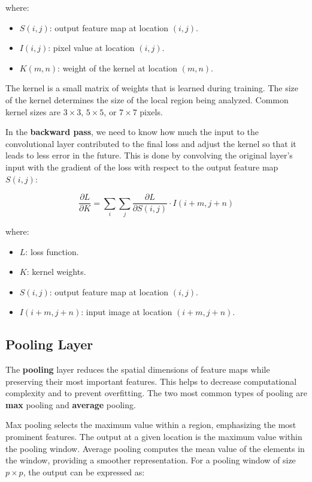 \documentclass[a4paper]{report}
\begin{document}
where:
\begin{itemize}
    \item $S(i,j)$: output feature map at location $(i,j)$.
    \item $I(i,j)$: pixel value at location $(i,j)$.
    \item $K(m,n)$: weight of the kernel at location $(m,n)$.
\end{itemize}

The kernel is a small matrix of weights that is learned during training. The size of the kernel determines the size of the local region being analyzed. Common kernel sizes are $3 \times 3$, $5 \times 5$, or $7 \times 7$ pixels.

In the \textbf{backward pass}, we need to know how much the input to the convolutional layer contributed to the final loss and adjust the kernel so that it leads to less error in the future. This is done by convolving the original layer's input with the gradient of the loss with respect to the output feature map $S(i,j)$:

\begin{equation*}
\frac{\partial L}{\partial K} = \sum_i \sum_j \frac{\partial L}{\partial S(i,j)} \cdot I(i+m,j+n)
\end{equation*}

where:
\begin{itemize}
    \item $L$: loss function.
    \item $K$: kernel weights.
    \item $S(i,j)$: output feature map at location $(i,j)$.
    \item $I(i+m,j+n)$: input image at location $(i+m,j+n)$.
\end{itemize}

\subsection*{Pooling Layer}

The \textbf{pooling} layer reduces the spatial dimensions of feature maps while preserving their most important features. This helps to decrease computational complexity and to prevent overfitting. The two most common types of pooling are \textbf{max} pooling and \textbf{average} pooling.

Max pooling selects the maximum value within a region, emphasizing the most prominent features. The output at a given location is the maximum value within the pooling window. Average pooling computes the mean value of the elements in the window, providing a smoother representation. For a pooling window of size $p \times p$, the output can be expressed as:
\end{document}
